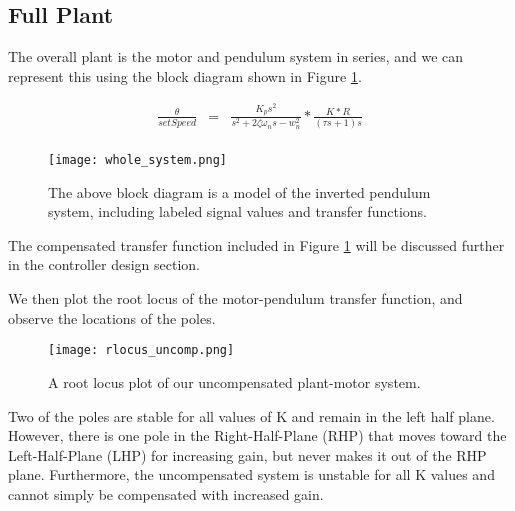 \documentclass[onecolumn, draftclass]{IEEEtran} %
\begin{document}
\subsection{Full Plant}

The overall plant is the motor and pendulum system in series, and we can represent this using the block diagram shown in Figure \ref{block_diagram}.

\begin{eqnarray}
\label{pend_transfer_fcn}
\frac{\theta}{setSpeed} &=& \frac{K_ps^2}{s^2+2\zeta\omega_ns - w_n^2}*\frac{K*R}{(\tau s+1)s}\\
\end{eqnarray}


\begin{figure}[h!]
\begin{center}
\texttt{[image: whole\_system.png]}
\caption{The above block diagram is a model of the inverted pendulum system, including labeled signal values and transfer functions.}
\label{block_diagram}
\end{center}
\end{figure}

The compensated transfer function included in Figure \ref{block_diagram} will be discussed further in the controller design section.


We then plot the root locus of the motor-pendulum transfer function, and observe the locations of the poles.

\begin{figure}[h!]
\begin{center}
\texttt{[image: rlocus\_uncomp.png]}
\caption{A root locus plot of our uncompensated plant-motor system.}
\label{rlocus_uncomp}
\end{center}
\end{figure}

Two of the poles are stable for all values of K and remain in the left half plane.  However, there is one pole in the Right-Half-Plane (RHP) that moves toward the Left-Half-Plane (LHP) for increasing gain, but never makes it out of the RHP plane.  Furthermore, the uncompensated system is unstable for all K values and cannot simply be compensated with increased gain.
\end{document}

